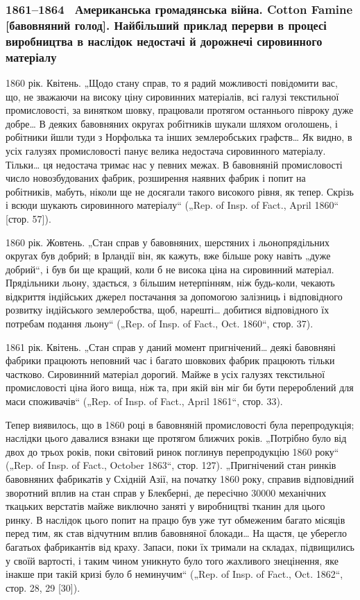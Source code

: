 
\subsubsection{1861--1864~ Американська громадянська війна. Cotton Famine [бавовняний
голод]. Найбільший приклад перерви в процесі виробництва в наслідок
недостачі й дорожнечі сировинного матеріалу}

1860 рік. Квітень. „Щодо стану справ, то я радий можливості
повідомити вас, що, не зважаючи на високу ціну сировинних
матеріалів, всі галузі текстильної промисловості, за винятком
шовку, працювали протягом останнього півроку дуже добре\dots{}
В деяких бавовняних округах робітників шукали шляхом оголошень,
і робітники йшли туди з Норфолька та інших землеробських
графств\dots{} Як видно, в усіх галузях промисловості панує велика недостача
сировинного матеріалу. Тільки\dots{} ця недостача тримає нас
у певних межах. В бавовняній промисловості число новозбудованих
фабрик, розширення наявних фабрик і попит на робітників,
мабуть, ніколи ще не досягали такого високого рівня, як
тепер. Скрізь і всюди шукають сировинного матеріалу“ („Rep.
of Insp. of Fact., April 1860“ [стор. 57]).

1860 рік. Жовтень. „Стан справ у бавовняних, шерстяних
і льонопрядільних округах був добрий; в Ірландії він, як кажуть,
вже більше року навіть „дуже добрий“, і був би ще кращий,
коли б не висока ціна на сировинний матеріал. Прядільники
льону, здається, з більшим нетерпінням, ніж будь-коли,
чекають відкриття індійських джерел постачання за допомогою
залізниць і відповідного розвитку індійського землеробства, щоб,
нарешті\dots{} добитися відповідного їх потребам подання льону“
(„Rep. of Insp. of Fact., Oct. 1860“, стор. 37).

1861 рік. Квітень. „Стан справ у даний момент пригнічений\dots{}
деякі бавовняні фабрики працюють неповний час і багато шовкових
фабрик працюють тільки частково. Сировинний матеріал
дорогий. Майже в усіх галузях текстильної промисловості
ціна його вища, ніж та, при якій він міг би бути перероблений
для маси споживачів“ („Rep. of Insp. of Fact., April 1861“, стор. 33).

Тепер виявилось, що в 1860 році в бавовняній промисловості
була перепродукція; наслідки цього давалися взнаки ще протягом
ближчих років. „Потрібно було від двох до трьох років,
поки світовий ринок поглинув перепродукцію 1860 року“ („Rep.
of Insp. of Fact., October 1863“, стор. 127). „Пригнічений стан
ринків бавовняних фабрикатів у Східній Азії, на початку 1860 року,
справив відповідний зворотний вплив на стан справ у Блекберні,
де пересічно \num{30000} механічних ткацьких верстатів майже виключно
заняті у виробництві тканин для цього ринку. В наслідок
цього попит на працю був уже тут обмеженим багато місяців
перед тим, як став відчутним вплив бавовняної блокади\dots{}
На щастя, це уберегло багатьох фабрикантів від краху. Запаси,
поки їх тримали на складах, підвищились у своїй вартості, і таким
чином уникнуто було того жахливого знецінення, яке
інакше при такій кризі було б неминучим“ („Rep. of Insp. of
Fact., Oct. 1862“, стор. 28, 29 [30]).
